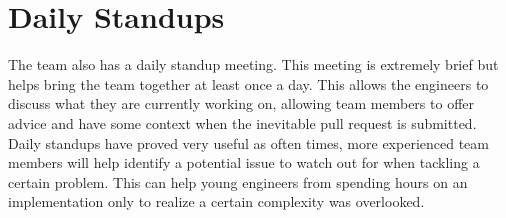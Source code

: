 \section{Daily Standups}
The \team{} team also has a daily standup meeting. This meeting is extremely brief but helps bring the team together at least once a day. This allows the engineers to discuss what they are currently working on, allowing team members to offer advice and have some context when the inevitable pull request is submitted. Daily standups have proved very useful as often times, more experienced team members will help identify a potential issue to watch out for when tackling a certain problem. This can help young engineers from spending hours on an implementation only to realize a certain complexity was overlooked. 
